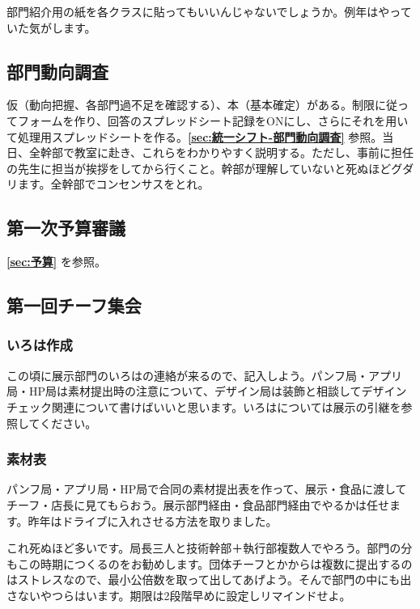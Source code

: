 \documentclass[dvipdfmx,jb5]{jreport}
\begin{document}
部門紹介用の紙を各クラスに貼ってもいいんじゃないでしょうか。例年はやっていた気がします。


\subsection{部門動向調査}
仮（動向把握、各部門過不足を確認する）、本（基本確定）がある。制限に従ってフォームを作り、回答のスプレッドシート記録をONにし、さらにそれを用いて処理用スプレッドシートを作る。{\bf \ref{sec:統一シフト-部門動向調査}} 参照。当日、全幹部で教室に赴き、これらをわかりやすく説明する。ただし、事前に担任の先生に担当が挨拶をしてから行くこと。幹部が理解していないと死ぬほどグダリます。全幹部でコンセンサスをとれ。

\subsection{第一次予算審議}
{\bf \ref{sec:予算}} を参照。

\subsection{第一回チーフ集会}\label{sec:第一回チーフ集会}
\subsubsection{いろは作成}
この頃に展示部門のいろはの連絡が来るので、記入しよう。パンフ局・アプリ局・HP局は素材提出時の注意について、デザイン局は装飾と相談してデザインチェック関連について書けばいいと思います。いろはについては展示の引継を参照してください。

\subsubsection{素材表}
パンフ局・アプリ局・HP局で合同の素材提出表を作って、展示・食品に渡してチーフ・店長に見てもらおう。展示部門経由・食品部門経由でやるかは任せます。昨年はドライブに入れさせる方法を取りました。

これ死ぬほど多いです。局長三人と技術幹部＋執行部複数人でやろう。部門の分もこの時期につくるのをお勧めします。団体チーフとかからは複数に提出するのはストレスなので、最小公倍数を取って出してあげよう。そんで部門の中にも出さないやつらはいます。期限は2段階早めに設定しリマインドせよ。
\end{document}
